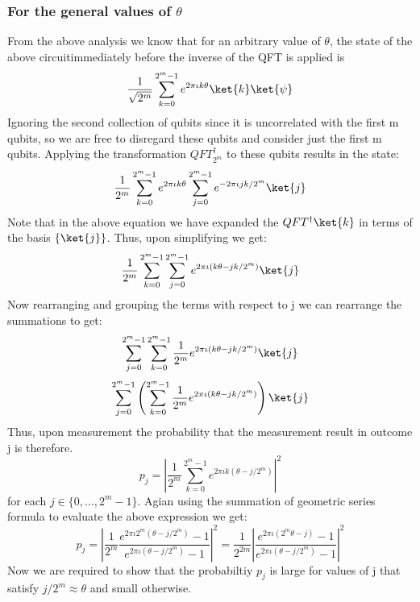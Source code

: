 \documentclass[12pt, oneside]{book}
\theoremstyle{definition}
\theoremstyle{definition}
\theoremstyle{remark}
\begin{document}
\subsubsection{For the general values of $\theta$}
From the above analysis we know that for an arbitrary value of $\theta$, the state of the above circuitimmediately before the inverse of the QFT is applied is
\[
\frac{1}{\sqrt{2^m}}\sum_{k=0}^{2^m-1}e^{2\pi\iota k\theta}\ket{k}\ket{\psi}
\]
Ignoring the second collection of qubits since it is uncorrelated with the first m qubits, so we are free to disregard these qubits and consider just the first m qubits. Applying the
transformation $QFT_{2^m}^{\dagger}$  to these qubits results in the state:
\[
\frac{1}{2^m}\sum_{k=0}^{2^m-1}e^{2\pi\iota k\theta}\sum_{j=0}^{2^m-1}e^{-2\pi\iota jk/2^m}\ket{j}
\]
Note that in the above equation we have expanded the $QFT^{\dagger}\ket{k}$ in terms of the basis $\{\ket{j}\}$.
Thus, upon simplifying we get:
\[
\frac{1}{2^m}\sum_{k=0}^{2^m-1}\sum_{j=0}^{2^m-1} e^{2\pi\iota(k\theta-jk/2^m)}\ket{j}
\]
Now rearranging and grouping the terms with respect to j we can rearrange the summations to get:
\[
\sum_{j=0}^{2^m-1}\sum_{k=0}^{2^m-1}\frac{1}{2^m}e^{2\pi\iota(k\theta-jk/2^m)}\ket{j}
\]
\[
    \sum_{j=0}^{2^m-1}\left(\sum_{k=0}^{2^m-1}\frac{1}{2^m}e^{2\pi\iota(k\theta-jk/2^m)}\right)\ket{j}
\]
Thus, upon measurement the probability that the measurement result in outcome j is therefore.
\[
p_j=\left|\frac{1}{2^m}\sum_{k=0}^{2^m-1}e^{2\pi\iota k(\theta-j/2^m)}\right|^2
\]
for each $j \in \{0,\ldots,2^m-1\}$. 
Agian using the summation of geometric series formula to evaluate the above expression we get:
\[
p_j=\left|\frac{1}{2^m}\frac{e^{2\pi\iota 2^m(\theta-j/2^m)}-1}{e^{2\pi\iota (\theta-j/2^m)}-1}\right|^2=\frac{1}{2^{2m}}\left|\frac{e^{2\pi\iota(2^m\theta-j)}-1}{e^{2\pi\iota(\theta-j/2^m)}-1}\right|^2
\]
Now we are required to show that the probabiltiy $p_j$ is large for values of j that satisfy $j/2^m\approx \theta$ and small otherwise.
\end{document}
